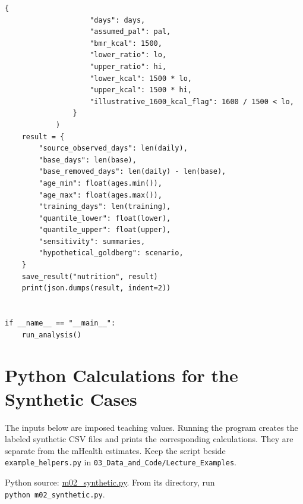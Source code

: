 \begin{Verbatim}[breaklines,breakanywhere,fontsize=\small]
                {
                    "days": days,
                    "assumed_pal": pal,
                    "bmr_kcal": 1500,
                    "lower_ratio": lo,
                    "upper_ratio": hi,
                    "lower_kcal": 1500 * lo,
                    "upper_kcal": 1500 * hi,
                    "illustrative_1600_kcal_flag": 1600 / 1500 < lo,
                }
            )
    result = {
        "source_observed_days": len(daily),
        "base_days": len(base),
        "base_removed_days": len(daily) - len(base),
        "age_min": float(ages.min()),
        "age_max": float(ages.max()),
        "training_days": len(training),
        "quantile_lower": float(lower),
        "quantile_upper": float(upper),
        "sensitivity": summaries,
        "hypothetical_goldberg": scenario,
    }
    save_result("nutrition", result)
    print(json.dumps(result, indent=2))


if __name__ == "__main__":
    run_analysis()
\end{Verbatim}

\hypertarget{M02-python-calculations-for-the-synthetic-cases}{%
\section{Python Calculations for the Synthetic
Cases}\label{M02-python-calculations-for-the-synthetic-cases}}

\noindent The inputs below are imposed teaching values. Running the program
creates the labeled synthetic CSV files and prints the corresponding
calculations. They are separate from the mHealth estimates. Keep the
script beside \texttt{example\_helpers.py} in
\texttt{03\_Data\_and\_Code/Lecture\_Examples}.

\FloatBarrier
{}
Python source:
\href{../03_Data_and_Code/Lecture_Examples/m02_synthetic.py}{m02\_synthetic.py}.
From its directory, run \texttt{python\ m02\_synthetic.py}.


